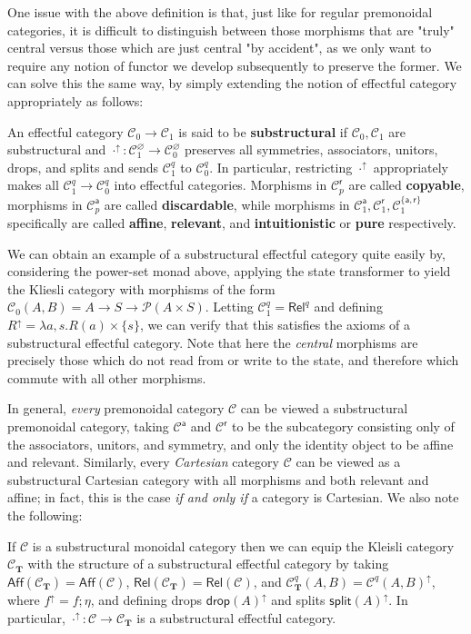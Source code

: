 \documentclass[acmsmall,screen,review]{acmart}
\newcommand{\mc}[1]{\ensuremath{\mathcal{#1}}}
\newcommand{\mb}[1]{\ensuremath{\mathbf{#1}}}
\newcommand{\ms}[1]{\ensuremath{\mathsf{#1}}}
\newcommand{\upg}[2]{{#1}^{\uparrow #2}}
\begin{document}
One issue with the above definition is that, just like for regular premonoidal
categories, it is difficult to distinguish between those morphisms that are
"truly" central versus those which are just central "by accident", as we only
want to require any notion of functor we develop subsequently to preserve the
former. We can solve this the same way, by simply extending the notion of
effectful category appropriately as follows:
\begin{definition}
  An effectful category \(\mc{C}_0 \to \mc{C}_1\) is said to be
  \textbf{substructural} if \(\mc{C}_0, \mc{C}_1\) are substructural and
  \(\upg{\cdot}{}: \mc{C}_1^\varnothing \to \mc{C}_0^\varnothing\) preserves all
  symmetries, associators, unitors, drops, and splits and sends \(\mc{C}_1^q\)
  to \(\mc{C}_0^q\). In particular, restricting \(\upg{\cdot}{}\) appropriately
  makes all \(\mc{C}_1^q \to \mc{C}_0^q\) into effectful categories. Morphisms
  in \(\mc{C}_p^{\ms{r}}\) are called \textbf{copyable}, morphisms in
  \(\mc{C}_p^{\ms{a}}\) are called \textbf{discardable}, while morphisms in
  \(\mc{C}_1^{\ms{a}}, \mc{C}_1^{\ms{r}}, \mc{C}_1^{\{\ms{a}, \ms{r}\}}\)
  specifically are called \textbf{affine}, \textbf{relevant}, and
  \textbf{intuitionistic} or \textbf{pure} respectively.
\end{definition}
We can obtain an example of a substructural effectful category quite easily by,
considering the power-set monad above, applying the state transformer to yield
the Kliesli category with morphisms of the form \(\mc{C}_0(A, B) = A \to S \to
\mc{P}(A \times S)\). Letting \(\mc{C}_1^q = \ms{Rel}^q\) and defining
\(\upg{R}{} = \lambda a, s. R(a) \times \{s\}\), we can verify that this
satisfies the axioms of a substructural effectful category. Note that here the
\textit{central} morphisms are precisely those which do not read from or write
to the state, and therefore which commute with all other morphisms.

In general, \textit{every} premonoidal category \(\mc{C}\) can be viewed a
substructural premonoidal category, taking \(\mc{C}^{\ms{a}}\) and
\(\mc{C}^{\ms{r}}\) to be the subcategory consisting only of the associators,
unitors, and symmetry, and only the identity object to be affine and relevant.
Similarly, every \textit{Cartesian} category \(\mc{C}\) can be viewed as a
substructural Cartesian category with all morphisms and both relevant and
affine; in fact, this is the case \textit{if and only if} a category is
Cartesian. We also note the following:
\begin{proposition}
  If \(\mc{C}\) is a substructural monoidal category then we can equip the
  Kleisli category \(\mc{C}_{\mb{T}}\) with the structure of a substructural
  effectful category by taking \(\ms{Aff}(\mc{C}_{\mb{T}}) = \ms{Aff}(\mc{C})\),
  \(\ms{Rel}(\mc{C}_{\mb{T}}) = \ms{Rel}(\mc{C})\), and \(\mc{C}_{\mb{T}}^q(A,
  B) = \upg{\mc{C}^q(A, B)}{}\), where \(\upg{f}{} = f;\eta\), and defining
  drops \(\upg{\ms{drop}(A)}{}\) and splits \(\upg{\ms{split}(A)}{}\). In
  particular, \(\upg{\cdot}{}: \mc{C} \to \mc{C}_{\mb{T}}\) is a substructural
  effectful category.
\end{proposition}
\end{document}
